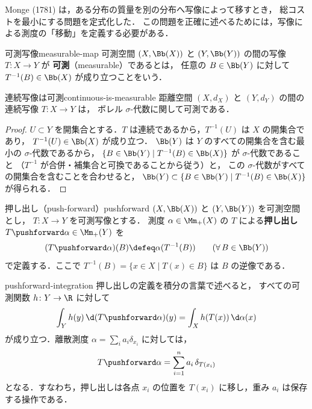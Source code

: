 Monge (1781) は，ある分布の質量を別の分布へ写像によって移すとき，
総コストを最小にする問題を定式化した．
この問題を正確に述べるためには，写像による測度の「移動」を定義する必要がある．

\begin{definition}{可測写像}{measurable-map}
  可測空間 $(X, \Bb(X))$ と $(Y, \Bb(Y))$ の間の写像 $T \colon X \to Y$ が
  \textbf{可測}（measurable）であるとは，
  任意の $B \in \Bb(Y)$ に対して $T^{-1}(B) \in \Bb(X)$ が成り立つことをいう．
\end{definition}

\begin{proposition}{連続写像は可測}{continuous-is-measurable}
  距離空間 $(X, d_X)$ と $(Y, d_Y)$ の間の連続写像 $T \colon X \to Y$ は，
  ボレル $\sigma$-代数に関して可測である．
\end{proposition}

\begin{proof}
  $U \subset Y$ を開集合とする．$T$ は連続であるから，$T^{-1}(U)$ は $X$ の開集合であり，
  $T^{-1}(U) \in \Bb(X)$ が成り立つ．
  $\Bb(Y)$ は $Y$ のすべての開集合を含む最小の $\sigma$-代数であるから，
  $\{B \in \Bb(Y) \mid T^{-1}(B) \in \Bb(X)\}$ が $\sigma$-代数であること
  （$T^{-1}$ が合併・補集合と可換であることから従う）と，
  この $\sigma$-代数がすべての開集合を含むことを合わせると，
  $\Bb(Y) \subset \{B \in \Bb(Y) \mid T^{-1}(B) \in \Bb(X)\}$ が得られる．
\end{proof}

\begin{definition}{押し出し（push-forward）}{pushforward}
  $(X, \Bb(X))$ と $(Y, \Bb(Y))$ を可測空間とし，
  $T \colon X \to Y$ を可測写像とする．
  測度 $\alpha \in \Mm_+(X)$ の $T$ による\textbf{押し出し}
  $T\pushforward \alpha \in \Mm_+(Y)$ を
  \[
    (T\pushforward \alpha)(B) \defeq \alpha(T^{-1}(B))
    \qquad (\forall\, B \in \Bb(Y))
  \]
  で定義する．ここで $T^{-1}(B) = \{x \in X \mid T(x) \in B\}$ は $B$ の逆像である．
\end{definition}

\begin{remark}{}{pushforward-integration}
  押し出しの定義を積分の言葉で述べると，
  すべての可測関数 $h \colon Y \to \R$ に対して
  \[
    \int_Y h(y) \, \d(T\pushforward \alpha)(y) = \int_X h(T(x)) \, \d\alpha(x)
  \]
  が成り立つ．離散測度 $\alpha = \sum_i a_i \delta_{x_i}$ に対しては，
  \[
    T\pushforward \alpha = \sum_{i=1}^n a_i \, \delta_{T(x_i)}
  \]
  となる．すなわち，押し出しは各点 $x_i$ の位置を $T(x_i)$ に移し，重み $a_i$ は保存する操作である．
\end{remark}

